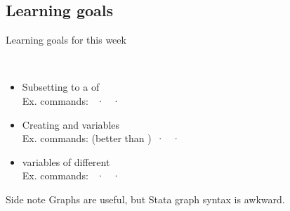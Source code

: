 \documentclass[t]{beamer}
\begin{document}
  \subsection{Learning goals}

 \begin{frame}[t]{Learning goals for this week}

   \\[1em]

	\begin{itemize}
		\item Subsetting to a  of \\[.5em]%
      Ex. commands:  ·  · \\[.5em]%
		\item Creating and  variables\\[.5em]%
      Ex. commands:  (better than ) ·  · \\[.5em]%
		\item {} variables of different \\[.5em]%
      Ex. commands:  ·  · \\[.5em]%
	\end{itemize}

    \begin{block}{Side note}
       Graphs are useful, but Stata graph syntax is awkward.
    \end{block}

  \end{frame}
  
\end{document}

